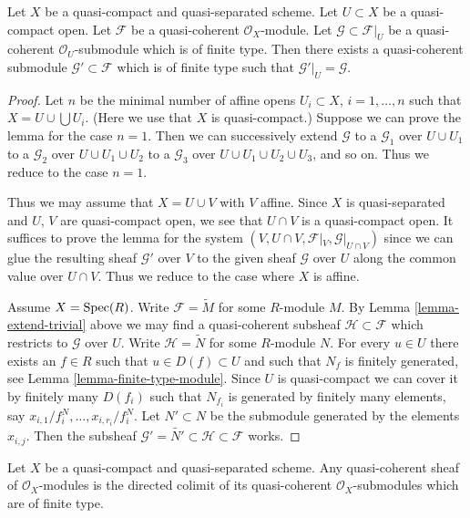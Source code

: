 \begin{lemma}
\label{lemma-extend}
Let $X$ be a quasi-compact and quasi-separated scheme.
Let $U \subset X$ be a quasi-compact open.
Let $\mathcal{F}$ be a quasi-coherent $\mathcal{O}_X$-module.
Let $\mathcal{G} \subset \mathcal{F}|_U$ be a quasi-coherent
$\mathcal{O}_U$-submodule which is of finite type. Then
there exists a quasi-coherent submodule $\mathcal{G}' \subset \mathcal{F}$
which is of finite type such that $\mathcal{G}'|_U = \mathcal{G}$.
\end{lemma}

\begin{proof}
Let $n$ be the minimal number of affine opens $U_i \subset X$,
$i = 1, \ldots , n$ such that $X = U \cup \bigcup U_i$.
(Here we use that $X$ is quasi-compact.) Suppose
we can prove the lemma for the case $n = 1$. Then we can successively
extend $\mathcal{G}$
to a $\mathcal{G}_1$ over $U \cup U_1$
to a $\mathcal{G}_2$ over $U \cup U_1 \cup U_2$
to a $\mathcal{G}_3$ over $U \cup U_1 \cup U_2 \cup U_3$,
and so on.
Thus we reduce to the case $n = 1$.

\medskip\noindent
Thus we may assume that $X = U \cup V$ with $V$ affine.
Since $X$ is quasi-separated and $U$, $V$ are quasi-compact open,
we see that $U \cap V$ is a quasi-compact open. It suffices to prove the
lemma for the system $(V, U \cap V, \mathcal{F}|_V, \mathcal{G}|_{U \cap V})$
since we can glue the resulting sheaf $\mathcal{G}'$ over $V$
to the given sheaf $\mathcal{G}$ over $U$ along the common value
over $U \cap V$.
Thus we reduce to the case where $X$ is affine.

\medskip\noindent
Assume $X = \mathop{\mathrm{Spec}}(R)$. Write $\mathcal{F} = \widetilde M$
for some $R$-module $M$. By Lemma \ref{lemma-extend-trivial} above we may
find a quasi-coherent subsheaf $\mathcal{H} \subset \mathcal{F}$
which restricts to $\mathcal{G}$ over $U$.
Write $\mathcal{H} = \widetilde N$ for some $R$-module $N$.
For every $u \in U$ there exists an $f \in R$ such that
$u \in D(f) \subset U$ and such that $N_f$ is finitely generated,
see Lemma \ref{lemma-finite-type-module}.
Since $U$ is quasi-compact we can cover it by finitely
many $D(f_i)$ such that $N_{f_i}$ is generated by
finitely many elements, say $x_{i, 1}/f_i^N, \ldots, x_{i, r_i}/f_i^N$.
Let $N' \subset N$ be the submodule generated by the elements
$x_{i, j}$. Then the subsheaf
$\mathcal{G}' = \widetilde{N'} \subset \mathcal{H} \subset \mathcal{F}$
works.
\end{proof}

\begin{lemma}
\label{lemma-quasi-coherent-colimit-finite-type}
Let $X$ be a quasi-compact and quasi-separated scheme.
Any quasi-coherent sheaf of $\mathcal{O}_X$-modules
is the directed colimit of its quasi-coherent
$\mathcal{O}_X$-submodules which are of finite type.
\end{lemma}

